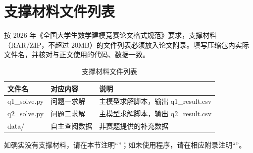 \section{支撑材料文件列表}

按 2026 年《全国大学生数学建模竞赛论文格式规范》要求，支撑材料（RAR/ZIP，不超过 20MB）的文件列表必须放入论文附录。填写压缩包内实际文件名，并核对与正文使用的代码、数据一致。

\begin{table}[htbp]
  \centering
  \caption{支撑材料文件列表}
  \begin{tabular}{lll}
      \toprule[1.5pt]
      文件名 & 对应内容 & 说明 \\
      \midrule[1pt]
      q1\_solve.py & 问题一求解 & 主模型求解脚本，输出 q1\_result.csv \\
      q2\_solve.py & 问题二求解 & 主模型求解脚本，输出 q2\_result.csv \\
      data/ & 自主查阅数据 & 非赛题提供的补充数据 \\
      \bottomrule[1.5pt]
  \end{tabular}
  \label{tab:appendix-support-files}
\end{table}

如确实没有支撑材料，请在本节注明“”；如未使用程序，请在相应附录注明“”。
